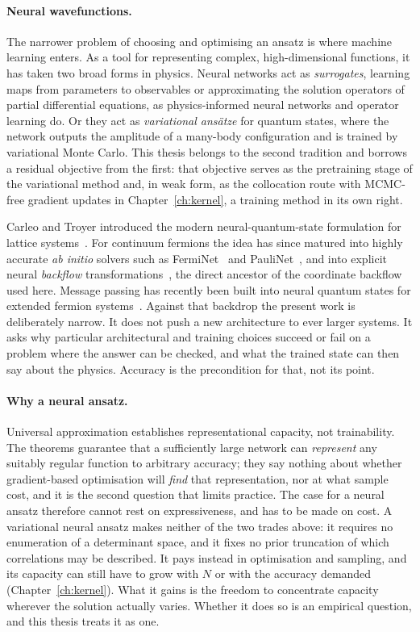 \paragraph{Neural wavefunctions.}
The narrower problem of choosing and optimising an ansatz is where machine learning
enters. As a tool for representing complex, high-dimensional functions, it has taken two
broad forms in physics. Neural networks act as
\emph{surrogates}, learning maps from parameters to observables or approximating the
solution operators of partial differential equations, as physics-informed neural networks
and operator learning do. Or they act as \emph{variational ans\"atze} for quantum states,
where the network outputs the amplitude of a many-body configuration and is trained by
variational Monte Carlo. This thesis belongs to the second tradition and borrows a residual
objective from the first: that objective serves as the pretraining stage of the variational
method and, in weak form, as the collocation route with MCMC-free gradient updates in
Chapter~\ref{ch:kernel}, a training method in its own right.

Carleo and Troyer introduced the modern neural-quantum-state formulation for lattice
systems~\cite{Carleo2017-NQS}. For continuum fermions the idea has
since matured into highly accurate \emph{ab initio} solvers such as
FermiNet~\cite{Pfau2020-FermiNet} and PauliNet~\cite{Hermann2020-PauliNet}, and into
explicit neural \emph{backflow} transformations~\cite{LuoClark2019-NeuralBackflow}, the
direct ancestor of the coordinate backflow used here. Message passing has recently been
built into neural quantum states for extended fermion
systems~\cite{Pescia2024-MessagePassingNQS,KimEtAl2023-UltracoldFermiNQS}. Against that
backdrop the present work is deliberately narrow. It does not push a new architecture to
ever larger systems. It asks why particular architectural and training choices succeed or
fail on a problem where the answer can be checked, and what the trained state can then
say about the physics. Accuracy is the precondition for that, not its point.

\paragraph{Why a neural ansatz.}
Universal approximation establishes representational capacity, not trainability. The
theorems guarantee that a sufficiently large network can \emph{represent} any suitably
regular function to arbitrary accuracy; they say nothing about whether gradient-based
optimisation will \emph{find} that representation, nor at what sample cost, and it is the
second question that limits practice. The case for a neural ansatz therefore cannot rest
on expressiveness, and has to be made on cost. A variational neural ansatz makes neither of
the two trades above: it requires no enumeration of a determinant space, and it fixes no
prior truncation of which correlations may be described. It pays instead in optimisation
and sampling, and its capacity can still have to grow with $N$ or with the accuracy
demanded (Chapter~\ref{ch:kernel}). What it gains is the freedom to concentrate capacity
wherever the solution actually varies. Whether it does so is an empirical question, and
this thesis treats it as one.

